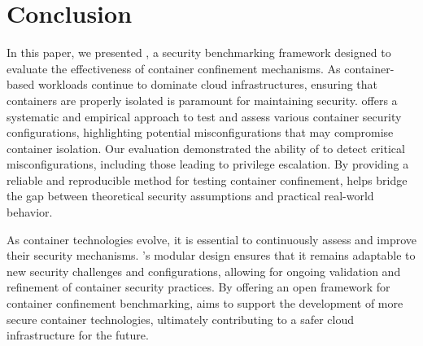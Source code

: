 \section{Conclusion}
\label{sec:conclusion}

In this paper, we presented \houdini, a security benchmarking framework designed to evaluate the effectiveness of container confinement mechanisms. As container-based workloads continue to dominate cloud infrastructures, ensuring that containers are properly isolated is paramount for maintaining security. \houdini offers a systematic and empirical approach to test and assess various container security configurations, highlighting potential misconfigurations that may compromise container isolation. Our evaluation demonstrated the ability of \houdini to detect critical misconfigurations, including those leading to privilege escalation. By providing a reliable and reproducible method for testing container confinement, \houdini helps bridge the gap between theoretical security assumptions and practical real-world behavior.

As container technologies evolve, it is essential to continuously assess and improve their security mechanisms. \houdini's modular design ensures that it remains adaptable to new security challenges and configurations, allowing for ongoing validation and refinement of container security practices. By offering an open framework for container confinement benchmarking, \houdini aims to support the development of more secure container technologies, ultimately contributing to a safer cloud infrastructure for the future.
